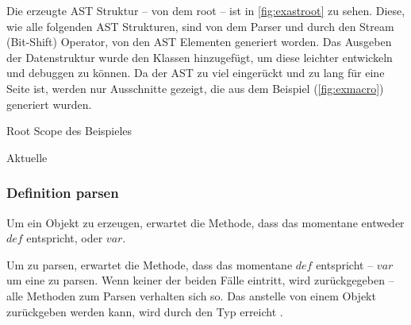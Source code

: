 {    Die erzeugte AST Struktur -- von dem root  -- ist in \autoref{fig:exastroot} zu sehen. Diese, wie alle folgenden AST Strukturen, sind von dem Parser und durch den Stream (Bit-Shift) Operator, von den AST Elementen generiert worden. Das Ausgeben der Datenstruktur wurde den  Klassen hinzugefügt, um diese leichter entwickeln und debuggen zu können. Da der AST zu viel eingerückt und zu lang für eine Seite ist, werden nur Ausschnitte gezeigt, die aus dem Beispiel (\autoref{fig:exmacro}) generiert wurden.
    \begin{paracol}{2}
      \begin{myCodeEnv}
        \centering
        \begin{myInvBox}[width=.9\linewidth]
          
        \end{myInvBox}
        \caption{Root Scope des Beispieles}
        \label{fig:exastroot}
      \end{myCodeEnv}
      \switchcolumn
      \begin{myCodeEnv}
        \centering
        \begin{myInvBox}[width=.9\linewidth]
          
        \end{myInvBox}
        \caption*{Aktuelle }
      \end{myCodeEnv}
    \end{paracol}

    \subsubsection{Definition parsen}
    \label{sssec:Definition parsen}
      Um ein  Objekt zu erzeugen, erwartet die  Methode, dass das momentane  entweder \myRIn$def$ entspricht, oder \myRIn$var$.

      Um  zu parsen, erwartet die Methode, dass das momentane  \myRIn$def$ entspricht -- \myRIn$var$ um eine  zu parsen. Wenn keiner der beiden Fälle eintritt, wird  zurückgegeben -- alle Methoden zum Parsen verhalten sich so. Das  anstelle von einem  Objekt zurückgeben werden kann, wird durch den  Typ erreicht \autocite{cpp-fundamentals}.

}
